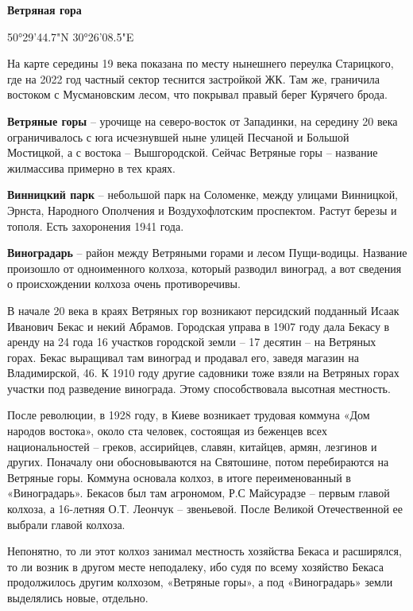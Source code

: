 \medskip


\textbf{Ветряная гора}

50°29'44.7"N 30°26'08.5"E

На карте середины 19 века показана по месту нынешнего переулка Старицкого, где на 2022 год частный сектор теснится застройкой ЖК. Там же, граничила востоком с Мусмановским лесом, что покрывал правый берег Курячего брода.\\

\medskip

\textbf{Ветряные горы} – урочище на северо-восток от Западинки, на середину 20 века ограничивалось с юга исчезнувшей ныне улицей Песчаной и Большой Мостицкой, а с востока – Вышгородской. Сейчас Ветряные горы – название жилмассива примерно в тех краях.\\

\medskip

\textbf{Винницкий парк} – небольшой парк на Соломенке, между улицами Винницкой, Эрнста, Народного Ополчения и Воздухофлотским проспектом. Растут березы и тополя. Есть захоронения 1941 года.\\

\medskip

\textbf{Виноградарь} – район между Ветряными горами и лесом Пущи-водицы. Название произошло от одноименного колхоза, который разводил виноград, а вот сведения о происхождении колхоза очень противоречивы.

В начале 20 века в краях Ветряных гор возникают персидский подданный Исаак Иванович Бекас и некий Абрамов. Городская управа в 1907 году дала Бекасу в аренду на 24 года 16 участков городской земли – 17 десятин – на Ветряных горах. Бекас выращивал там виноград и продавал его, заведя магазин на Владимирской, 46. К 1910 году другие садовники тоже взяли на Ветряных горах участки под разведение винограда. Этому способствовала высотная местность.

После революции, в 1928 году, в Киеве возникает трудовая коммуна «Дом народов востока», около ста человек, состоящая из беженцев всех национальностей – греков, ассирийцев, славян, китайцев, армян, лезгинов и других. Поначалу они обосновываются на Святошине, потом перебираются на Ветряные горы. Коммуна основала колхоз, в итоге переименованный в «Виноградарь». Бекасов был там агрономом, Р.С Майсурадзе – первым главой колхоза, а 16-летняя О.Т. Леончук – звеньевой. После Великой Отечественной ее выбрали главой колхоза.

Непонятно, то ли этот колхоз занимал местность хозяйства Бекаса и расширялся, то ли возник в другом месте неподалеку, ибо судя по всему хозяйство Бекаса продолжилось другим колхозом, «Ветряные горы», а под «Виноградарь» земли выделялись новые, отдельно.\\ 

